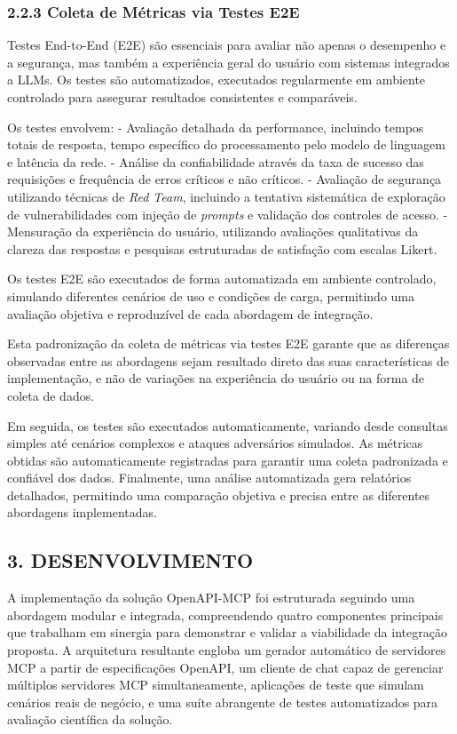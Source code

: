 \documentclass[
]{article}
\begin{document}
\subsubsection{2.2.3 Coleta de Métricas via Testes
E2E}\label{coleta-de-muxe9tricas-via-testes-e2e}

Testes End-to-End (E2E) são essenciais para avaliar não apenas o
desempenho e a segurança, mas também a experiência geral do usuário com
sistemas integrados a LLMs. Os testes são automatizados, executados
regularmente em ambiente controlado para assegurar resultados
consistentes e comparáveis.

Os testes envolvem: - Avaliação detalhada da performance, incluindo
tempos totais de resposta, tempo específico do processamento pelo modelo
de linguagem e latência da rede. - Análise da confiabilidade através da
taxa de sucesso das requisições e frequência de erros críticos e não
críticos. - Avaliação de segurança utilizando técnicas de \emph{Red
Team}, incluindo a tentativa sistemática de exploração de
vulnerabilidades com injeção de \emph{prompts} e validação dos controles
de acesso. - Mensuração da experiência do usuário, utilizando avaliações
qualitativas da clareza das respostas e pesquisas estruturadas de
satisfação com escalas Likert.

Os testes E2E são executados de forma automatizada em ambiente
controlado, simulando diferentes cenários de uso e condições de carga,
permitindo uma avaliação objetiva e reproduzível de cada abordagem de
integração.

Esta padronização da coleta de métricas via testes E2E garante que as
diferenças observadas entre as abordagens sejam resultado direto das
suas características de implementação, e não de variações na experiência
do usuário ou na forma de coleta de dados.

Em seguida, os testes são executados automaticamente, variando desde
consultas simples até cenários complexos e ataques adversários
simulados. As métricas obtidas são automaticamente registradas para
garantir uma coleta padronizada e confiável dos dados. Finalmente, uma
análise automatizada gera relatórios detalhados, permitindo uma
comparação objetiva e precisa entre as diferentes abordagens
implementadas.

\subsection{3. DESENVOLVIMENTO}\label{desenvolvimento}

A implementação da solução OpenAPI-MCP foi estruturada seguindo uma
abordagem modular e integrada, compreendendo quatro componentes
principais que trabalham em sinergia para demonstrar e validar a
viabilidade da integração proposta. A arquitetura resultante engloba um
gerador automático de servidores MCP a partir de especificações OpenAPI,
um cliente de chat capaz de gerenciar múltiplos servidores MCP
simultaneamente, aplicações de teste que simulam cenários reais de
negócio, e uma suíte abrangente de testes automatizados para avaliação
científica da solução.
\end{document}
